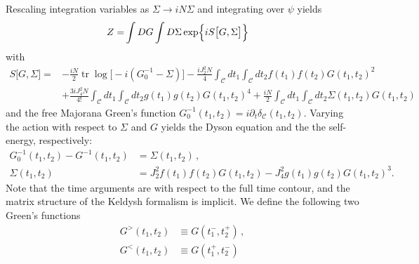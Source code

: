 \documentclass[prx,aps,onecolumn,amsfonts,showpacs,superscriptaddress,preprint,eqsecnum]
{revtex4-1}
\begin{document}
Rescaling integration variables as $\Sigma \rightarrow i N\Sigma$ and 
integrating over $\psi$ yields
\begin{equation}
\begin{split}
Z	
	=& \int DG \int D\Sigma \operatorname{exp}\Bigl\{i S\bigl[G, 
\Sigma\bigr]\Bigr\}
\end{split}
\end{equation}
with
\begin{equation}
\begin{split}
	S\bigl[G, \Sigma\bigr] =& -\frac{iN}{2} 
\operatorname{tr}\operatorname{log}\bigl[-i(G_0^{-1} - \Sigma)\bigr] - \frac{i 
J_2^2 N}{4} \int_{\mathcal C} dt_1 \int_{\mathcal C} dt_2 f(t_1) f(t_2) G(t_1, t_2)^2\\
	&+\frac{3i J_4^2 N}{4!} \int_{\mathcal C} dt_1 \int_{\mathcal C} dt_2 g(t_1) 
g(t_2) G(t_1, t_2)^4 + \frac{iN}{2} \int_{\mathcal C} dt_1 \int_{\mathcal C} dt_2 
\Sigma(t_1, t_2) G(t_1, t_2) \label{eq:countouraction}
\end{split}
\end{equation}
and the free Majorana Green's function $G_0^{-1}(t_1,t_2) = i \partial_t \delta_{\mathcal{C}}(t_1,t_2)$.
\!Varying the action with respect to $\Sigma$ and $G$ yields the Dyson equation and the 
 the self-energy, respectively:
\begin{align}
	 G_0^{-1}(t_1, t_2) - G^{-1}(t_1, t_2) &= \Sigma(t_1, t_2) \, , \label{eq:SD} \\
	\Sigma(t_1, t_2) &= J_2^2 f(t_1) f(t_2) G(t_1, t_2) - J_4^2 g(t_1) g(t_2) G(t_1, t_2)^3.
	\label{eq:SelfEnergy_Contour}
\end{align}
Note that the time arguments are with respect to the full time contour, 
and the matrix structure of the Keldysh formalism is implicit. 
We 
define the following two Green's functions  
\begin{subequations}
	\begin{align}
G^{>}(t_1,t_2) &\equiv G(t^{-}_1,t^{+}_2) \, ,	%
\label{eq:-+}
	\\
G^{<}(t_1,t_2) &\equiv G(t^{+}_1,t^{-}_2) \, %
\end{align}
\end{subequations}
\end{document}
